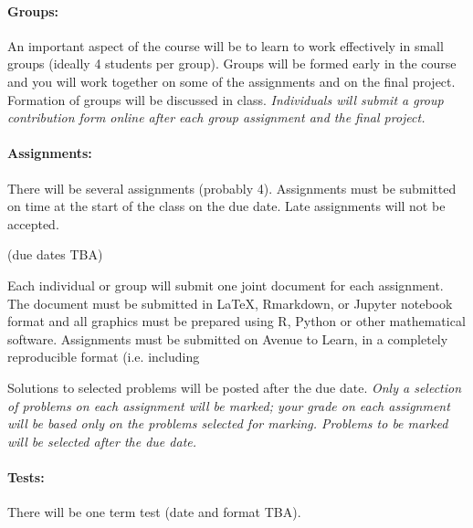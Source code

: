 \documentclass[12pt]{article}
\newcommand{\note}{\noindent{\bfseries\slshape Note:\/} }
\begin{document}
\paragraph*{Groups:} An important aspect of the course will be to learn to work effectively in small groups (ideally 4 students per group).  Groups will be formed early in the course and you will work together on some of the assignments and on the final project.  Formation of groups will be discussed in class.  \emph{Individuals will submit a group contribution form online after each group assignment and the final project.}

\paragraph*{Assignments:} There will be several assignments (probably 4).  Assignments must be submitted on time at the start of the class on the due date.  Late assignments will not be accepted.

(due dates TBA)

\noindent
Each individual or group will submit one joint document for each assignment.  The
document must be submitted in \LaTeX, Rmarkdown, or Jupyter notebook format and all graphics must be prepared
using R, Python or other mathematical software.  Assignments must be submitted on Avenue to Learn, in a completely
reproducible format (i.e. including

Solutions to selected problems will be posted after the due date.
\note \emph{Only a selection of problems on each assignment will be marked; your grade on each assignment will be based only on the problems selected for marking.  Problems to be marked will be selected after the due date.}



\paragraph*{Tests:}

There will be one term test (date and format TBA).
\end{document}
